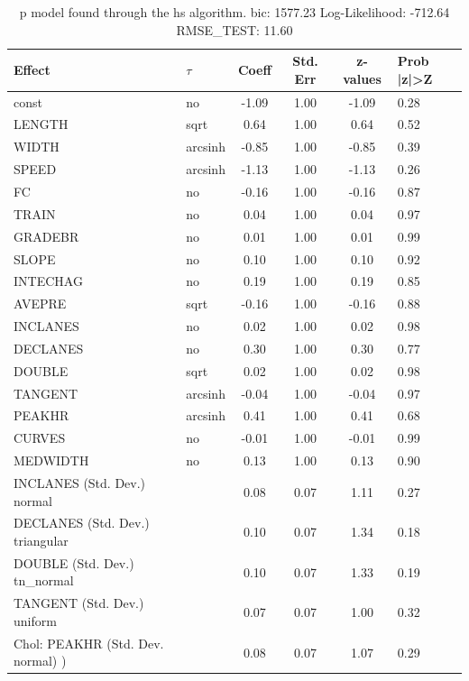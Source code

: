 \begin{table}
	\caption{p model found through the hs algorithm. bic: 1577.23 Log-Likelihood: -712.64 RMSE_TEST: 11.60}
	\begin{center}
		\begin{tabular}{|l|l|c|c|c|l|}
			\hline
			Effect & $\tau$ & Coeff & Std. Err & z-values & Prob |z|>Z \\
			\hline
			const & no & -1.09 & 1.00 & -1.09 & 0.28 \\
			\hline
			LENGTH & sqrt & 0.64 & 1.00 & 0.64 & 0.52 \\
			\hline
			WIDTH & arcsinh & -0.85 & 1.00 & -0.85 & 0.39 \\
			\hline
			SPEED & arcsinh & -1.13 & 1.00 & -1.13 & 0.26 \\
			\hline
			FC & no & -0.16 & 1.00 & -0.16 & 0.87 \\
			\hline
			TRAIN & no & 0.04 & 1.00 & 0.04 & 0.97 \\
			\hline
			GRADEBR & no & 0.01 & 1.00 & 0.01 & 0.99 \\
			\hline
			SLOPE & no & 0.10 & 1.00 & 0.10 & 0.92 \\
			\hline
			INTECHAG & no & 0.19 & 1.00 & 0.19 & 0.85 \\
			\hline
			AVEPRE & sqrt & -0.16 & 1.00 & -0.16 & 0.88 \\
			\hline
			INCLANES & no & 0.02 & 1.00 & 0.02 & 0.98 \\
			\hline
			DECLANES & no & 0.30 & 1.00 & 0.30 & 0.77 \\
			\hline
			DOUBLE & sqrt & 0.02 & 1.00 & 0.02 & 0.98 \\
			\hline
			TANGENT & arcsinh & -0.04 & 1.00 & -0.04 & 0.97 \\
			\hline
			PEAKHR & arcsinh & 0.41 & 1.00 & 0.41 & 0.68 \\
			\hline
			CURVES & no & -0.01 & 1.00 & -0.01 & 0.99 \\
			\hline
			MEDWIDTH & no & 0.13 & 1.00 & 0.13 & 0.90 \\
			\hline
			INCLANES (Std. Dev.) normal &  & 0.08 & 0.07 & 1.11 & 0.27 \\
			\hline
			DECLANES (Std. Dev.) triangular &  & 0.10 & 0.07 & 1.34 & 0.18 \\
			\hline
			DOUBLE (Std. Dev.) tn_normal &  & 0.10 & 0.07 & 1.33 & 0.19 \\
			\hline
			TANGENT (Std. Dev.) uniform &  & 0.07 & 0.07 & 1.00 & 0.32 \\
			\hline
			 Chol: PEAKHR (Std. Dev. normal) ) &  & 0.08 & 0.07 & 1.07 & 0.29 \\

\end{tabular}
\end{center}
\end{table}
